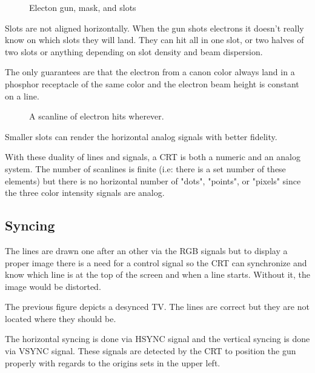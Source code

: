 


\begin{figure}[H]
\caption*{Electon gun, mask, and slots}
\end{figure}

Slots are not aligned horizontally. When the gun shots electrons it doesn't really know on which slots they will land. They can hit all in one slot, or two halves of two slots or anything depending on slot density and beam dispersion. 

The only guarantees are that the electron from a canon color always land in a phosphor receptacle of the same color and the electron beam height is constant on a line.

\begin{figure}[H]
\caption*{A scanline of electron hits wherever.}
\end{figure}

Smaller slots can render the horizontal analog signals with better fidelity.





 With these duality of lines and signals, a CRT is both a numeric and an analog system. The number of scanlines is finite (i.e: there is a set number of these elements) but there is no horizontal number of "dots", "points", or "pixels" since the three color intensity signals are analog.


\subsection{Syncing}
The lines are drawn one after an other via the RGB signals but to display a proper image there is a need for a control signal so the CRT can synchronize and know which line is at the top of the screen and when a line starts. Without it, the image would be distorted. 



The previous figure depicts a desynced TV. The lines are correct but they are not located where they should be.

The horizontal syncing is done via HSYNC signal and the vertical syncing is done via VSYNC signal. These signals are detected by the CRT to position the gun properly with regards to the origins sets in the upper left.

